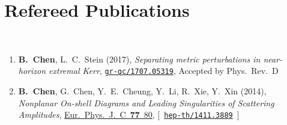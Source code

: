 \newcommand{\grqc}[1]{\href{http://arxiv.org/abs/#1}{\texttt{gr-qc/#1}}}
\newcommand{\hepth}[1]{\href{http://arxiv.org/abs/#1}{\texttt{hep-th/#1}}}


\newcommand{\baoyi}[1]{\textbf{B.~Chen},}


\section*{\sc Refereed Publications}~
\vspace{-.2in}

\begin{enumerate}

    \item
    \baoyi,
    L.~C.~Stein
    (2017),
    {\it Separating metric perturbations in near-horizon extremal Kerr},
    \grqc{1707.05319}, Accepted by Phys.~Rev.~D

    \item 
    \baoyi,
    G.~Chen,
    Y.~E.~Cheung,  
    Y.~Li,         
    R.~Xie,
    Y.~Xin
    (2014),
    {\it Nonplanar On-shell Diagrams and Leading Singularities of Scattering Amplitudes},
    \href{http://dx.doi.org/10.1140/epjc/s10052-017-4659-2}{Eur.~Phys.~J.~C~{\bf77}~80},
    [~\hepth{1411.3889}~]
\end{enumerate}

